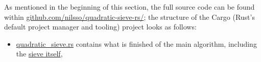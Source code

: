 \documentclass{report}
\begin{document}
As mentioned in the beginning of this section, the full source code can be found
within
\href{https://github.com/nilsso/quadratic-sieve-rs/tree/main/src}{github.com/nilsso/quadratic-sieve-rs/};
the structure of the Cargo (Rust's default project manager and tooling) project
looks as follows:
\begin{itemize}
    \item %
        \href{https://github.com/nilsso/quadratic-sieve-rs/blob/main/src/quadratic_sieve.rs}{quadratic_sieve.rs}
        contains what is finished of the main algorithm, including the
        \href{https://github.com/nilsso/quadratic-sieve-rs/blob/main/src/quadratic_sieve.rs#L115}{sieve
        itself},
\end{itemize}
\end{document}
